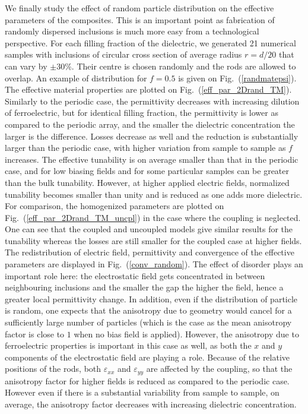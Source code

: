 \documentclass[aps,prb,11pt]{revtex4-1}
\newcommand{\fig}[1]{Fig.~(\ref{#1})}
\begin{document}
We finally study the effect of random particle distribution on the effective parameters of the
composites. This is an important point as fabrication of randomly dispersed
inclusions is much more easy from a technological perspective. For each filling fraction of the dielectric,
we generated 21 numerical samples with inclusions of circular cross section of average radius
$r=d/20$ that can vary by $\pm 30\%$. Their centre is chosen randomly and the
rods are allowed to overlap. An example of distribution for $f=0.5$ is given on \fig{randmatepsi}.
The effective material properties are plotted on \fig{eff_par_2Drand_TM}.
Similarly to the periodic case, the permittivity decreases with increasing dilution of
ferroelectric, but for identical filling fraction,
the permittivity is lower as compared to the periodic array, and the smaller the dielectric concentration the larger
is the difference. Losses decrease as well and the reduction is substantially larger
than the periodic case, with higher variation from sample to sample as $f$ increases.
The effective tunability is on average smaller than that in the periodic case, and
for low biasing fields and for some particular samples can be greater than the bulk tunability. However,
at higher applied electric fields, normalized tunability becomes smaller than unity and
is reduced as one adds more dielectric. For comparison, the homogenized
parameters are plotted on \fig{eff_par_2Drand_TM_uncpl} in the case where the coupling is
neglected. One can see that the coupled and uncoupled models give
similar results for the tunability whereas the losses are still smaller for the coupled case
at higher fields.\\
The redistribution of electric field, permittivity and convergence of
the effective parameters are displayed in \fig{conv_random}. The effect of
disorder plays an important role here: the electrostatic field gets concentrated
in between neighbouring inclusions and the smaller the gap the higher the field, hence
a greater local permittivity change. In addition, even if the distribution of particle is
random, one expects that the anisotropy due to geometry would cancel for a sufficiently large number
of particles (which is the case as the mean anisotropy factor is close to $1$ when no
bias field is applied). However, the anisotropy due to ferroelectric properties is
important in this case as well, as both the $x$ and $y$ components of the electrostatic field
are playing a role.
Because of the relative positions of the rods, both $\varepsilon_{xx}$ and $\varepsilon_{yy}$ are affected
by the coupling, so that the anisotropy factor for higher fields is reduced as compared to the periodic case.
However even if there is a substantial variability from sample to sample, on average, the anisotropy factor
decreases with increasing dielectric concentration.
\end{document}

